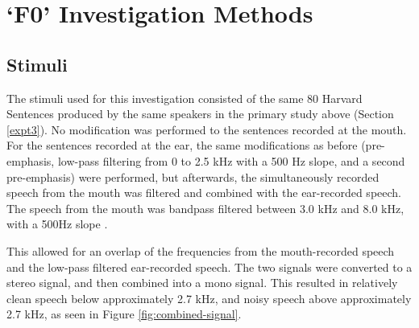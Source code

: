 

\section{`F0' Investigation Methods}
\label{F0-methods}

\subsection{Stimuli}\label{F0-stimuli}

The stimuli used for this investigation consisted of the same 80 Harvard Sentences produced by the same speakers in the primary study above (Section \ref{expt3}).
No modification was performed to the sentences recorded at the mouth.  For the sentences recorded at the ear, the same modifications as before (pre-emphasis, low-pass filtering from 0 to 2.5 kHz with a 500 Hz slope, and a second pre-emphasis) were performed, but afterwards, the simultaneously recorded speech from the mouth was filtered and combined with the ear-recorded speech.  The speech from the mouth was bandpass filtered between 3.0 kHz and 8.0 kHz, with a 500Hz slope \DIFaddbegin {}\DIFaddend .  

This allowed for an overlap of the frequencies from the mouth-recorded speech and the low-pass filtered ear-recorded speech.  The two signals were converted to a stereo signal, and then combined into a mono signal.  This resulted in relatively clean speech below approximately 2.7 kHz, and noisy speech above approximately 2.7 kHz, as seen in Figure \ref{fig:combined-signal}.

